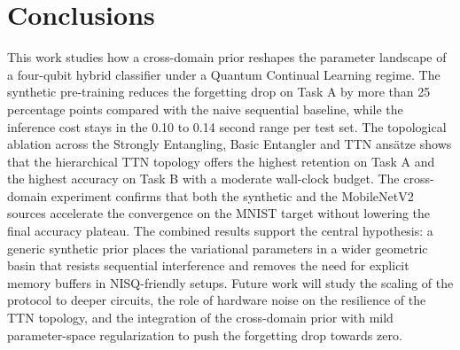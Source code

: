 \documentclass[runningheads]{llncs}
\begin{document}
\section{Conclusions}\label{sec:conclusions}

This work studies how a cross-domain prior reshapes the parameter landscape of a four-qubit hybrid classifier under a Quantum Continual Learning regime. The synthetic pre-training reduces the forgetting drop on Task A by more than 25 percentage points compared with the naive sequential baseline, while the inference cost stays in the 0.10 to 0.14 second range per test set. The topological ablation across the Strongly Entangling, Basic Entangler and TTN ans\"atze shows that the hierarchical TTN topology offers the highest retention on Task A and the highest accuracy on Task B with a moderate wall-clock budget. The cross-domain experiment confirms that both the synthetic and the MobileNetV2 sources accelerate the convergence on the MNIST target without lowering the final accuracy plateau. The combined results support the central hypothesis: a generic synthetic prior places the variational parameters in a wider geometric basin that resists sequential interference and removes the need for explicit memory buffers in NISQ-friendly setups. Future work will study the scaling of the protocol to deeper circuits, the role of hardware noise on the resilience of the TTN topology, and the integration of the cross-domain prior with mild parameter-space regularization to push the forgetting drop towards zero.



\end{document}
